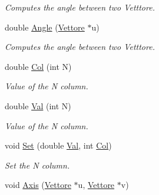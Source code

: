 \begin{DoxyCompactItemize}
\begin{DoxyCompactList}\small\item\em \-Computes the angle between two \-Vetttore. \end{DoxyCompactList}\item 
\hypertarget{classVettore_ac72b0f82d368ace2ef8090d276a9c751}{double \hyperlink{classVettore_ac72b0f82d368ace2ef8090d276a9c751}{\-Angle} (\hyperlink{classVettore}{\-Vettore} $\ast$u)}\label{classVettore_ac72b0f82d368ace2ef8090d276a9c751}

\begin{DoxyCompactList}\small\item\em \-Computes the angle between two \-Vetttore. \end{DoxyCompactList}\item 
\hypertarget{classVettore_ad018d767a0e0b15fbc17269db64d7574}{double \hyperlink{classVettore_ad018d767a0e0b15fbc17269db64d7574}{\-Col} (int \-N)}\label{classVettore_ad018d767a0e0b15fbc17269db64d7574}

\begin{DoxyCompactList}\small\item\em \-Value of the \-N column. \end{DoxyCompactList}\item 
\hypertarget{classVettore_a8fcbd69726df0d5309a4f2d790f427fd}{double \hyperlink{classVettore_a8fcbd69726df0d5309a4f2d790f427fd}{\-Val} (int \-N)}\label{classVettore_a8fcbd69726df0d5309a4f2d790f427fd}

\begin{DoxyCompactList}\small\item\em \-Value of the \-N column. \end{DoxyCompactList}\item 
\hypertarget{classVettore_af865716b201375aaca7c880377aa2426}{void \hyperlink{classVettore_af865716b201375aaca7c880377aa2426}{\-Set} (double \hyperlink{classVettore_a8fcbd69726df0d5309a4f2d790f427fd}{\-Val}, int \hyperlink{classVettore_ad018d767a0e0b15fbc17269db64d7574}{\-Col})}\label{classVettore_af865716b201375aaca7c880377aa2426}

\begin{DoxyCompactList}\small\item\em \-Set the \-N column. \end{DoxyCompactList}\item 
\hypertarget{classVettore_a5a767accac3ff301f062fce739190bb8}{void \hyperlink{classVettore_a5a767accac3ff301f062fce739190bb8}{\-Axis} (\hyperlink{classVettore}{\-Vettore} $\ast$u, \hyperlink{classVettore}{\-Vettore} $\ast$v)}\label{classVettore_a5a767accac3ff301f062fce739190bb8}


\end{DoxyCompactItemize}
